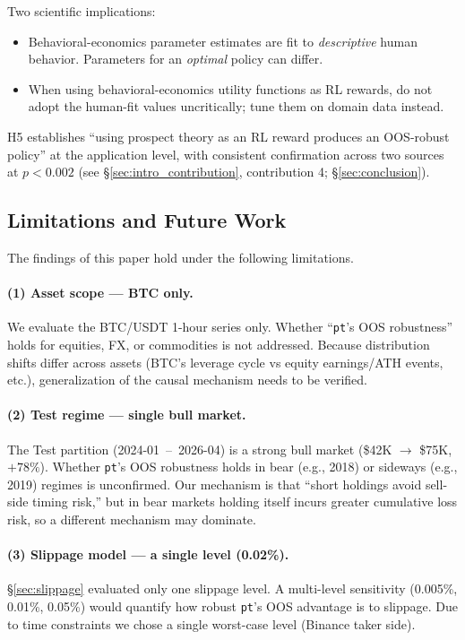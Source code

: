 \documentclass[11pt, a4paper]{article}
\begin{document}
Two scientific implications:
\begin{itemize}[leftmargin=*]
\item Behavioral-economics parameter estimates are fit to \emph{descriptive}
human behavior. Parameters for an \emph{optimal} policy can differ.
\item When using behavioral-economics utility functions as RL rewards,
do not adopt the human-fit values uncritically; tune them on
domain data instead.
\end{itemize}

H5 establishes ``using prospect theory as an RL reward produces an
OOS-robust policy'' at the application level, with consistent confirmation
across two sources at $p<0.002$
(see \S\ref{sec:intro_contribution}, contribution 4;
\S\ref{sec:conclusion}).

\subsection{Limitations and Future Work}
\label{sec:disc_limitations}

The findings of this paper hold under the following limitations.

\paragraph{(1) Asset scope --- BTC only.}
We evaluate the BTC/USDT 1-hour series only. Whether ``\texttt{pt}'s OOS
robustness'' holds for equities, FX, or commodities is not addressed.
Because distribution shifts differ across assets (BTC's leverage cycle vs
equity earnings/ATH events, etc.), generalization of the causal mechanism
needs to be verified.

\paragraph{(2) Test regime --- single bull market.}
The Test partition (2024-01 \,--\, 2026-04) is a strong bull market
(\$42K $\to$ \$75K, $+78\%$). Whether \texttt{pt}'s OOS robustness holds in
bear (e.g., 2018) or sideways (e.g., 2019) regimes is unconfirmed. Our
mechanism is that ``short holdings avoid sell-side timing risk,'' but in
bear markets holding itself incurs greater cumulative loss risk, so a
different mechanism may dominate.

\paragraph{(3) Slippage model --- a single level (0.02\%).}
\S\ref{sec:slippage} evaluated only one slippage level. A multi-level
sensitivity (0.005\%, 0.01\%, 0.05\%) would quantify how robust \texttt{pt}'s
OOS advantage is to slippage. Due to time constraints we chose a single
worst-case level (Binance taker side).
\end{document}
